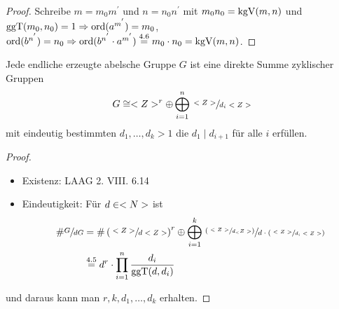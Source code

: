 \begin{proof}
	Schreibe $m = m_0 m^{'}$ und $n = n_0 n^{'}$ mit $m_0 n_0 = \operatorname{kgV}(m,n)$ und $\operatorname{ggT}(m_0, n_0) = 1 \Rightarrow \operatorname{ord}(a^{m^{'}}) = m_0$, $\operatorname{ord}(b^{n^{'}}) = n_0 \Rightarrow \operatorname{ord}(b^{n^{'}} \cdot a^{m^{'}}) \overset{4.6}{=} m_0 \cdot n_0 = \operatorname{kgV}(m,n)$.
\end{proof}

\begin{theorem}
	Jede endliche erzeugte abelsche Gruppe $G$ ist eine direkte Summe zyklischer Gruppen
	\begin{align}
		G \cong <Z>^{r} \oplus\bigoplus_{i=1}^n \sfrac{<Z>}{d_i <Z>} \notag
	\end{align}
	mit eindeutig bestimmten $d_1, \dots, d_k > 1$ die $d_1 \mid d_{i+1}$ für alle $i$ erfüllen.
\end{theorem}

\begin{proof}
	\begin{itemize}
		\item Existenz: LAAG 2. VIII. 6.14
		\item Eindeutigkeit: Für $d \in <N>$ ist 
		\begin{align}
			\# \qraum{G}{dG} &= \#\left( \qraum{\whole}{d \whole}\right)^r \oplus \bigoplus_{i=1}^k \qraum{\left(\qraum{\whole}{d_\whole}\right)}{d\cdot\left(\qraum{\whole}{d_i\whole}\right)} \notag \\
			&\overset{4.5}{=} d^r \cdot \prod_{i=1}^{n} \frac{d_i}{\ggT(d,d_i)}\notag
		\end{align} 
	\end{itemize}
und daraus kann man $r, k, d_1, \dots , d_k$ erhalten.
\end{proof}